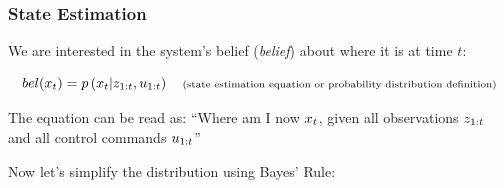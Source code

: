 \begin{frame}
    \frametitle{State Estimation}
    
    We are interested in the system's belief (\emph{belief}) about where it is at time $t$:
    
    \begin{equation*}
    bel(x_{t}) = p\left(x_{t} | z_{1:t}, u_{1:t} \right) \quad \text{\scriptsize (state estimation equation or probability distribution definition)}
    \end{equation*}
    
    The equation can be read as: ``Where am I now $x_{t}$, given all observations $z_{1:t}$ and all control commands $u_{1:t}$''
    
    \vspace{1cm}
    
    Now let's simplify the distribution using Bayes' Rule:
    
\end{frame}



